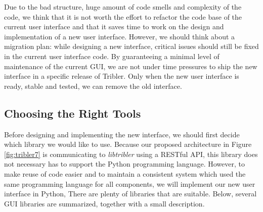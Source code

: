 Due to the bad structure, huge amount of code smells and complexity of the code, we think that it is not worth the effort to refactor the code base of the current user interface and that it saves time to work on the design and implementation of a new user interface. However, we should think about a migration plan: while designing a new interface, critical issues should still be fixed in the current user interface code. By guaranteeing a minimal level of maintenance of the current GUI, we are not under time pressures to ship the new interface in a specific release of Tribler. Only when the new user interface is ready, stable and tested, we can remove the old interface.

\subsection{Choosing the Right Tools}
Before designing and implementing the new interface, we should first decide which library we would like to use. Because our proposed architecture in Figure \ref{fig:tribler7} is communicating to \emph{libtribler} using a RESTful API, this library does not necessary has to support the Python programming language. However, to make reuse of code easier and to maintain a consistent system which used the same programming language for all components, we will implement our new user interface in Python, There are plenty of libraries that are suitable. Below, several GUI libraries are summarized, together with a small description.
